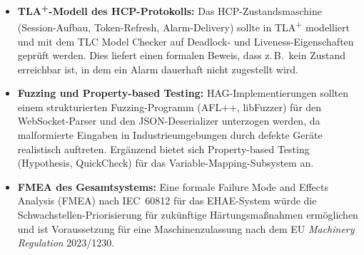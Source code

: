 ﻿\documentclass[12pt,a4paper]{article}
\begin{document}
\begin{itemize}[leftmargin=2em]
  \item \textbf{TLA\textsuperscript{+}-Modell des HCP-Protokolls:} Das
    HCP-Zustandsmaschine (Session-Aufbau, Token-Refresh, Alarm-Delivery) sollte
    in TLA\textsuperscript{+} modelliert und mit dem TLC Model Checker auf
    Deadlock- und Liveness-Eigenschaften geprüft werden. Dies liefert einen
    formalen Beweis, dass z.\,B.\ kein Zustand erreichbar ist, in dem ein
    Alarm dauerhaft nicht zugestellt wird.
  \item \textbf{Fuzzing und Property-based Testing:} HAG-Implementierungen
    sollten einem strukturierten Fuzzing-Programm (AFL++, libFuzzer) für
    den WebSocket-Parser und den JSON-Deserializer unterzogen werden, da
    malformierte Eingaben in Industrieumgebungen durch defekte Geräte
    realistisch auftreten. Ergänzend bietet sich Property-based Testing
    (Hypothesis, QuickCheck) für das Variable-Mapping-Subsystem an.
  \item \textbf{FMEA des Gesamtsystems:} Eine formale Failure Mode and Effects
    Analysis (FMEA) nach IEC~60812 für das EHAE-System würde die
    Schwachstellen-Priorisierung für zukünftige Härtungsmaßnahmen ermöglichen
    und ist Voraussetzung für eine Maschinenzulassung nach dem EU \emph{Machinery
    Regulation} 2023/1230.
\end{itemize}

%
\end{document}

